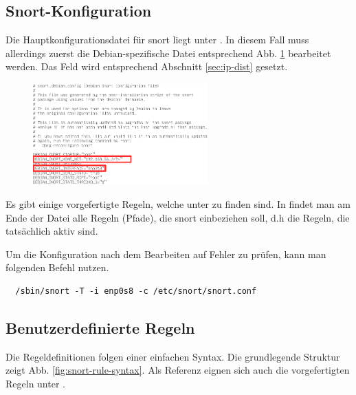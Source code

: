 
\subsection{Snort-Konfiguration}

Die Hauptkonfigurationsdatei für snort liegt unter . In diesem Fall muss allerdings zuerst die Debian-spezifische Datei  entsprechend Abb. \ref{fig:snort-debian-conf} bearbeitet werden. Das Feld  wird entsprechend Abschnitt \ref{sec:ip-dist} gesetzt.

\begin{figure}[H]
\centering
\includegraphics[width=0.6\textwidth]{graphics/attacks/snort-debian.png}
\caption{}\label{fig:snort-debian-conf}
\end{figure}


Es gibt einige vorgefertigte Regeln, welche unter  zu finden sind.
In  findet man am Ende der Datei alle Regeln (Pfade), die snort einbeziehen soll, d.h die Regeln, die tatsächlich aktiv sind.

Um die Konfiguration nach dem Bearbeiten auf Fehler zu prüfen, kann man folgenden Befehl nutzen.
\begin{verbatim}
  /sbin/snort -T -i enp0s8 -c /etc/snort/snort.conf
\end{verbatim}



\subsection{Benutzerdefinierte Regeln}

Die Regeldefinitionen folgen einer einfachen Syntax. Die grundlegende Struktur zeigt Abb. \ref{fig:snort-rule-syntax}. Als Referenz eignen sich auch die vorgefertigten Regeln unter .

